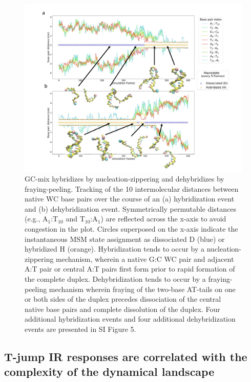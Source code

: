 \documentclass[journal=jpcbfk,manuscript=article]{achemso}
\begin{document}
\begin{figure}[ht!]
	\begin{center}
	\includegraphics[width=180mm, scale=1]{Fig4.pdf}
        \caption{GC-mix hybridizes by nucleation-zippering and dehybridizes by fraying-peeling. Tracking of the 10 intermolecular distances between native WC base pairs over the course of an (a) hybridization event and (b) dehybridization event. Symmetrically permutable distances (e.g., A$_1$:T$_{10}$ and T$_{10}$:A$_1$) are reflected across the x-axis to avoid congestion in the plot. Circles superposed on the x-axis indicate the instantaneous MSM state assignment as dissociated D (blue) or hybridized H (orange). Hybridization tends to occur by a nucleation-zippering mechanism, wherein a native G:C WC pair and adjacent A:T pair or central A:T pairs first form prior to rapid formation of the complete duplex. Dehybridization tends to occur by a fraying-peeling mechanism wherein fraying of the two-base AT-tails on one or both sides of the duplex precedes dissociation of the central native base pairs and complete dissolution of the duplex. Four additional hybridization events and four additional dehybridization events are presented in SI Figure 5.
        }
        \label{fig:GC-mix_transitions}
	\end{center}
\end{figure}






\subsection{\label{sec:stretch_comparison}T-jump IR responses are correlated with the complexity of the dynamical landscape}
\end{document}
